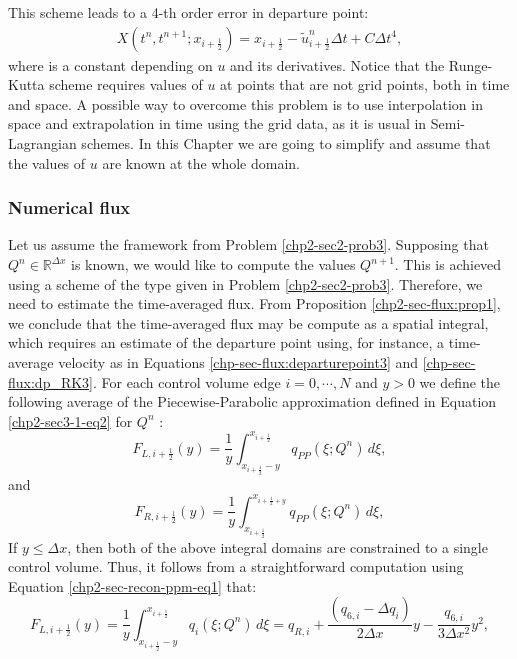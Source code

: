 This scheme leads to a 4-th order error in departure point: 
\begin{align}		
	X(t^n,t^{n+1};x_{i+\frac{1}{2}}) = x_{i+\frac{1}{2}} - \tilde{u}^{n}_{i+\frac{1}{2}}\Delta t + C\Delta t^4,
\end{align}
where is a constant depending on $u$ and its derivatives.
Notice that the Runge-Kutta scheme requires values of $u$ at points that are not grid points, both in time and space. 
A possible way to overcome this problem is to use interpolation in space and extrapolation in time using the grid data, 
as it is usual in Semi-Lagrangian schemes. In this Chapter we are going to simplify and assume that the values of $u$ are known at the
whole domain.
\subsubsection{Numerical flux}
Let us assume the framework from Problem \ref{chp2-sec2-prob3}.
Supposing that $Q^{n} \in \mathbb{R}^{\Delta x}$ is known,
we would like to compute the values $Q^{n+1}$.
This is achieved using a scheme of the type given in Problem \ref{chp2-sec2-prob3}.
Therefore, we need to estimate the time-averaged flux. 
From Proposition \ref{chp2-sec-flux:prop1}, we conclude that the time-averaged flux
may be compute as a spatial integral, which requires an estimate of the departure point using, for instance,
a time-average velocity as in Equations \eqref{chp-sec-flux:departurepoint3} and \eqref{chp-sec-flux:dp_RK3}.
For each control volume edge $i=0, \cdots, N$ and $y>0$ 
we define the following average of the Piecewise-Parabolic approximation
defined in Equation \eqref{chp2-sec3-1-eq2} for $Q^{n}$ \citep{colella:1984}:
\begin{equation}
	\label{chp-sec-flux:fL_1}
	F_{L,i+\frac{1}{2}}(y) = \frac{1}{y} \int_{x_{i+\frac{1}{2}}-y}^{x_{i+\frac{1}{2}}}
	q_{PP}(\xi;Q^n)\,d\xi,
\end{equation}
and
\begin{equation}
	\label{chp-sec-flux:fR_1}
	F_{R,i+\frac{1}{2}}(y) = \frac{1}{y} \int_{x_{i+\frac{1}{2}}}^{x_{i+\frac{1}{2}+y}}
	q_{PP}(\xi;Q^n)\,d\xi,
\end{equation}
If $y \leq \Delta x$, then both of the above integral domains
are constrained to a single control volume. Thus,
it follows from a straightforward computation using 
Equation \eqref{chp2-sec-recon-ppm-eq1} that:
\begin{equation}
	\label{chp-sec-flux:fL_2}
	F_{L,i+\frac{1}{2}}(y) = \frac{1}{y} \int_{x_{i+\frac{1}{2}}-y}^{x_{i+\frac{1}{2}}}
	q_{i}(\xi;Q^n)\,d\xi = 
	q_{R,i} +\frac{(q_{6,i} - \Delta q_i)}{2\Delta x}y
	- \frac{q_{6,i}}{3\Delta x^2}y^2,
\end{equation}
